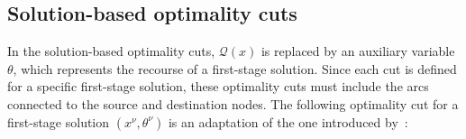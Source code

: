 \documentclass[11pt]{article}
\theoremstyle{definition}
\begin{document}




\subsection{Solution-based optimality cuts}
\label{ssec:solution-based}

In the solution-based optimality cuts, $\mathcal{Q}(x)$ is replaced by an auxiliary variable $\theta$, which represents the recourse of a first-stage solution.
Since each cut is defined for a specific first-stage solution, these optimality cuts must include the arcs connected to the source and destination nodes.
%
The following optimality cut for a first-stage solution $(x^{\nu}, \theta^\nu)$ is an adaptation of the one introduced by~\citet{Gendreau1995}:
\end{document}
